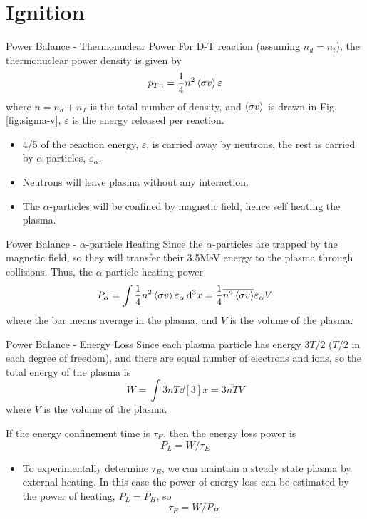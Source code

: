 \section{Ignition}
\begin{frame}{Power Balance - Thermonuclear Power}
	For D-T reaction (assuming $n_d=n_t$), the thermonuclear power density is given by
	\begin{equation}
		p_{Tn} = \frac{1}{4}n^2\expval{\sigma v}\varepsilon
		\label{eq:thermonuclear-power-density}
	\end{equation}
	where $n=n_d+n_T$ is the total number of density, and $\expval{\sigma v}$ is drawn in Fig.\ref{fig:sigma-v}, $\varepsilon$ is the energy released per reaction.

	\begin{itemize}
		\item 4/5 of the reaction energy, $\varepsilon$, is carried away by neutrons, the rest is carried by $\alpha$-particles, $\varepsilon_\alpha$.
		\item Neutrons will leave plasma without any interaction.
		\item The $\alpha$-particles will be confined by magnetic field, hence self heating the plasma.
	\end{itemize}
\end{frame}

\begin{frame}{Power Balance - $\alpha$-particle Heating}
	Since the $\alpha$-particles are trapped by the magnetic field, so they will transfer their 3.5MeV energy to the plasma through collisions. Thus, the $\alpha$-particle heating power
	\begin{equation}
		P_\alpha = \int \frac{1}{4}n^2\expval{\sigma v}\varepsilon_\alpha \dd[3]{x} = \frac{1}{4}\overline{n^2\expval{\sigma v}}\varepsilon_\alpha V
		\label{eq:power-alpha}
	\end{equation}
	where the bar means average in the plasma, and $V$ is the volume of the plasma.
\end{frame}

\begin{frame}{Power Balance - Energy Loss}
	Since each plasma particle has energy $3T/2$ ($T/2$ in each degree of freedom), and there are equal number of electrons and ions, so the total energy of the plasma is
	\begin{equation}
		W = \int 3nT\dd[3]{x} = 3\overline{nT}V
	\end{equation}
	where $V$ is the volume of the plasma.

	If the energy confinement time is $\tau_E$, then the energy loss power is
	\begin{equation}
		P_L = W/\tau_E
		\label{eq:power-loss}
	\end{equation}

	\begin{itemize}
		\item To experimentally determine $\tau_E$, we can maintain a steady state plasma by external heating. In this case the power of energy loss can be estimated by the power of heating, $P_L = P_H$, so
		      \[ \tau_E = W/P_H \]
	\end{itemize}
\end{frame}

